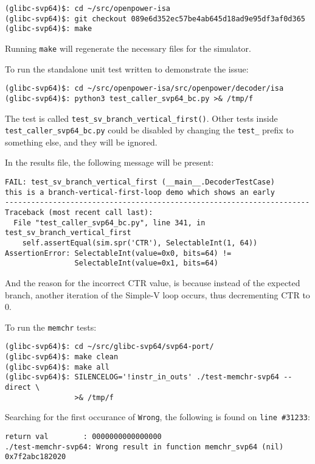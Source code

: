 \begin{verbatim}
(glibc-svp64)$: cd ~/src/openpower-isa
(glibc-svp64)$: git checkout 089e6d352ec57be4ab645d18ad9e95df3af0d365
(glibc-svp64)$: make
\end{verbatim}

Running \texttt{make} will regenerate the necessary files for the simulator.

To run the standalone unit test written to demonstrate the issue:
\begin{verbatim}
(glibc-svp64)$: cd ~/src/openpower-isa/src/openpower/decoder/isa
(glibc-svp64)$: python3 test_caller_svp64_bc.py >& /tmp/f
\end{verbatim}

The test is called \texttt{test\_sv\_branch\_vertical\_first()}. Other tests inside
\texttt{test\_caller\_svp64\_bc.py} could be disabled by changing the
\texttt{test\_} prefix to something else, and they will be ignored.

In the results file, the following message will be present:
\begin{verbatim}
FAIL: test_sv_branch_vertical_first (__main__.DecoderTestCase)
this is a branch-vertical-first-loop demo which shows an early
----------------------------------------------------------------------
Traceback (most recent call last):
  File "test_caller_svp64_bc.py", line 341, in test_sv_branch_vertical_first
    self.assertEqual(sim.spr('CTR'), SelectableInt(1, 64))
AssertionError: SelectableInt(value=0x0, bits=64) !=
                SelectableInt(value=0x1, bits=64)
\end{verbatim}

And the reason for the incorrect CTR value, is because instead of the expected
branch, another iteration of the Simple-V loop occurs, thus
decrementing CTR to 0.

To run the \texttt{memchr} tests:
\begin{verbatim}
(glibc-svp64)$: cd ~/src/glibc-svp64/svp64-port/
(glibc-svp64)$: make clean
(glibc-svp64)$: make all
(glibc-svp64)$: SILENCELOG='!instr_in_outs' ./test-memchr-svp64 --direct \
                >& /tmp/f
\end{verbatim}


Searching for the first occurance of \texttt{Wrong}, the following is found on
\texttt{line \#31233}:
\begin{verbatim}
return val        : 0000000000000000
./test-memchr-svp64: Wrong result in function memchr_svp64 (nil) 0x7f2abc182020
\end{verbatim}

